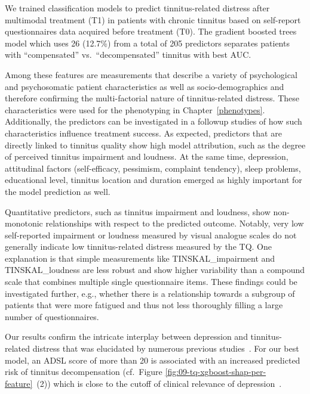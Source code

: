 \documentclass[
  oneside]{book}
\begin{document}
We trained classification models to predict tinnitus-related distress after multimodal treatment (T1) in patients with chronic tinnitus based on self-report questionnaires data acquired before treatment (T0).
The gradient boosted trees model which uses 26 (12.7\%) from a total of 205 predictors separates patients with ``compensated'' vs.~``decompensated'' tinnitus with best AUC.

Among these features are measurements that describe a variety of psychological and psychosomatic patient characteristics as well as socio-demographics and therefore confirming the multi-factorial nature of tinnitus-related distress.
These characteristics were used for the phenotyping in Chapter~\ref{phenotypes}.
Additionally, the predictors can be investigated in a followup studies of how such characteristics influence treatment success.
As expected, predictors that are directly linked to tinnitus quality show high model attribution, such as the degree of perceived tinnitus impairment and loudness.
At the same time, depression, attitudinal factors (self-efficacy, pessimism, complaint tendency), sleep problems, educational level, tinnitus location and duration emerged as highly important for the model prediction as well.

Quantitative predictors, such as tinnitus impairment and loudness, show non-monotonic relationships with respect to the predicted outcome.
Notably, very low self-reported impairment or loudness measured by visual analogue scales do not generally indicate low tinnitus-related distress measured by the TQ.
One explanation is that simple measurements like TINSKAL\_impairment and TINSKAL\_loudness are less robust and show higher variability than a compound scale that combines multiple single questionnaire items.
These findings could be investigated further, e.g., whether there is a relationship towards a subgroup of patients that were more fatigued and thus not less thoroughly filling a large number of questionnaires.

Our results confirm the intricate interplay between depression and tinnitus-related distress that was elucidated by numerous previous studies~\autocite{Dobie:DepressionTinnitus2003,Folmer:Tinnitus1999,Halford:AnxietyDepressionTinnitus1991,Langguth:TinnitusDepression2011,Salazar:Depression2019}.
For our best model, an ADSL score of more than 20 is associated with an increased predicted risk of tinnitus decompensation (cf.~Figure \ref{fig:09-tq-xgboost-shap-per-feature}~(2)) which is close to the cutoff of clinical relevance of depression~\autocite{Hautzinger:ADSL2003}.
\end{document}

